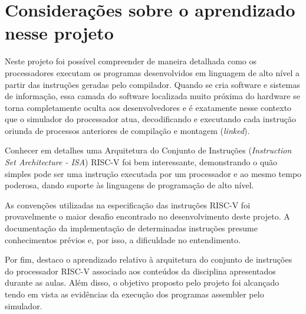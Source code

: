 
\section{Considerações sobre o aprendizado nesse projeto}

Neste projeto foi possível compreender de maneira detalhada como os processadores executam os programas desenvolvidos em linguagem de alto nível a partir das instruções geradas pelo compilador. Quando se cria software e sistemas de informação, essa camada do software localizada muito próxima do hardware se torna completamente oculta aos desenvolvedores e é exatamente nesse contexto que o simulador do processador atua, decodificando e executando cada instrução oriunda de processos anteriores de compilação e montagem (\textit{linked}).

Conhecer em detalhes uma Arquitetura do Conjunto de Instruções (\textit{Instruction Set Architecture - ISA}) RISC-V foi bem interessante, demonstrando o quão simples pode ser uma instrução executada por um processador e ao mesmo tempo poderosa, dando suporte às linguagens de programação de alto nível.

As convenções utilizadas na especificação das instruções RISC-V foi provavelmente o maior desafio encontrado no desenvolvimento deste projeto. A documentação da implementação de determinadas instruções presume conhecimentos prévios e, por isso, a dificuldade no entendimento.

Por fim, destaco o aprendizado relativo à arquitetura do conjunto de instruções do processador RISC-V associado aos conteúdos da disciplina apresentados durante as aulas. Além disso, o objetivo proposto pelo projeto foi alcançado tendo em vista as evidências da execução dos programas assembler pelo simulador.  